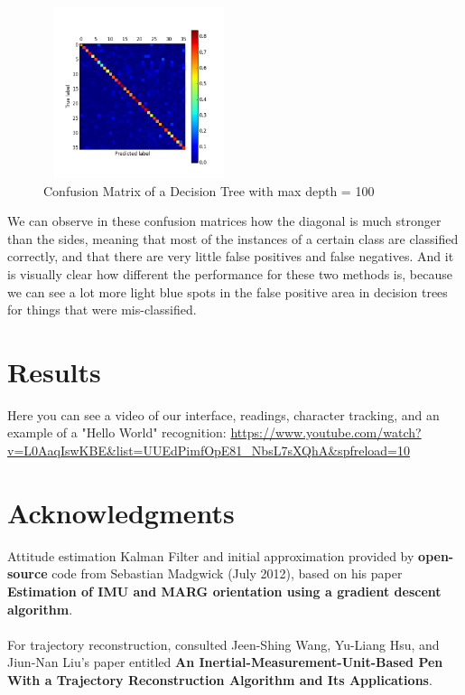 \documentclass{article}
\begin{document}
\begin{figure}[H]
	\centering
	\includegraphics[width=0.5\textwidth, height= 5cm]{cm_tree1_dt.png}
	\caption{Confusion Matrix of a Decision Tree with max depth = 100}
\end{figure} 
We can observe in these confusion matrices how the diagonal is much stronger than the sides, meaning that most of the instances of a certain class are classified correctly, and that there are very little false positives and false negatives.
And it is visually clear how different the performance for these two methods is, because we can see a lot more light blue spots in the false positive area in decision trees for things that were mis-classified.


\section{Results}
Here you can see a video of our interface, readings, character tracking, and an example of a "Hello World" recognition: 
\url{https://www.youtube.com/watch?v=L0AaqIswKBE&list=UUEdPimfOpE81_NbsL7sXQhA&spfreload=10}

\section*{Acknowledgments} 
 
Attitude estimation Kalman Filter and initial approximation provided by \textbf{open-source} code from Sebastian Madgwick (July 2012), based on his paper \textbf{Estimation of IMU and MARG orientation using a gradient descent algorithm}.\\\\
For trajectory reconstruction, consulted Jeen-Shing Wang, Yu-Liang Hsu, and Jiun-Nan Liu's paper entitled \textbf{An Inertial-Measurement-Unit-Based Pen With a Trajectory Reconstruction Algorithm and Its Applications}.
%
%
\end{document}
